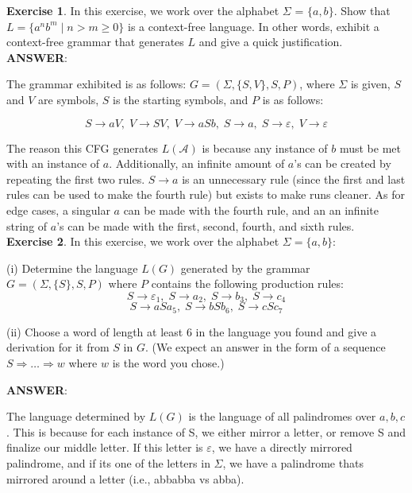 \documentclass{article}
\begin{document}
\textbf{Exercise 1}. In this exercise, we work over the alphabet $\Sigma$ = $\{a, b\}$. Show
that $L = \{a^nb^m \mid n > m \geq 0 \}$ is a context-free language. In other words,
exhibit a context-free grammar that generates $L$ and give a quick justification. \\

\textbf{ANSWER}:

The grammar exhibited is as follows: $G = (\Sigma, \{S, V\}, S, P)$, where $\Sigma$ is given, $S$ and $V$ are symbols, $S$ is the starting symbols, and $P$ is as follows:

\[S \rightarrow aV, \; V \rightarrow SV, \; V \rightarrow aSb, \; S \rightarrow a, \; S \rightarrow \varepsilon, \; V \rightarrow \varepsilon\]

The reason this CFG generates $L(\mathcal{A})$ is because any instance of $b$ must be met with an instance of $a$. Additionally, an infinite amount of $a$'s can be created by repeating the first two rules. $S \rightarrow a$ is an unnecessary rule (since the first and last rules can be used to make the fourth rule) but exists to make runs cleaner. As for edge cases, a singular $a$ can be made with the fourth rule, and an an infinite string of $a$'s can be made with the first, second, fourth, and sixth rules.\\

\textbf{Exercise 2}. In this exercise, we work over the alphabet $\Sigma = \{a, b\}$:

(i) Determine the language $L(G)$ generated by the grammar $G = (\Sigma, \{S\}, S, P)$
where $P$ contains the following production rules:
\[S \rightarrow \varepsilon_1, \; S \rightarrow a_2, \; S \rightarrow b_3, \; S \rightarrow c_4\]
\[S \rightarrow aSa_5, \; S \rightarrow bSb_6, \; S \rightarrow cSc_7\]

(ii) Choose a word of length at least 6 in the language you found and give
a derivation for it from $S$ in $G$. (We expect an answer in the form of a
sequence $S \Rightarrow \ldots \Rightarrow w$ where $w$ is the word you chose.)

\textbf{ANSWER}:

The language determined by $L(G)$ is the language of all palindromes over $a, b, c$. This is because for each instance of S, we either mirror a letter, or remove S and finalize our middle letter. If this letter is $\varepsilon$, we have a directly mirrored palindrome, and if its one of the letters in $\Sigma$, we have a palindrome thats mirrored around a letter (i.e., abbabba vs abba). 
\end{document}
